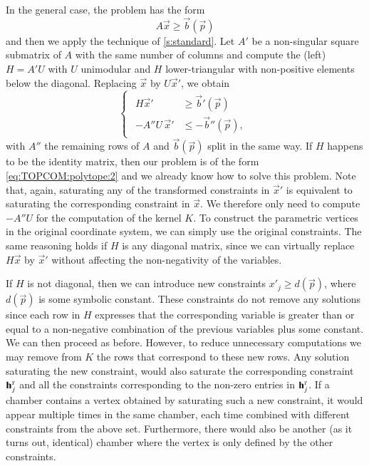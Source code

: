 In the general case, the problem has the form
$$
A \vec x \ge \vec b(\vec p)
$$
and then we apply the technique of \autoref{s:standard}.
Let $A'$ be a non-singular square submatrix of $A$ with the same number
of columns and compute the (left)  $H = A' U$ with $U$ unimodular
and $H$ lower-triangular with non-positive elements below the diagonal.
Replacing $\vec x$ by $U \vec x'$, we obtain
$$
\begin{cases}
    \begin{aligned}
H \vec x' &\ge \vec b'(\vec p)
\\
-A''U \, \vec x' &\le -\vec b''(\vec p)
,
    \end{aligned}
\end{cases}
$$
with $A''$ the remaining rows of $A$ and $\vec b(\vec p)$ split
in the same way.
If $H$ happens to be the identity matrix, then our problem is
of the form \eqref{eq:TOPCOM:polytope:2} and we already know how
to solve this problem.
Note that, again, saturating any of the transformed constraints
in $\vec x'$ is equivalent to saturating the corresponding constraint
in $\vec x$.  We therefore only need to compute $-A'' U$ for the
computation of the kernel $K$.  To construct the parametric vertices
in the original coordinate system, we can simply use the original
constraints.
The same reasoning holds if $H$ is any diagonal matrix, since
we can virtually replace $H \vec x$ by $\vec x'$ without affecting
the non-negativity of the variables.

If $H$ is not diagonal, then we can introduce new constraints
$x'_j \ge d(\vec p)$, where $d(\vec p)$ is some symbolic constant.
These constraints do not remove any solutions
since each row in $H$ expresses that the corresponding variable is
greater than or equal to a non-negative combination of the
previous variables plus some constant.
We can then proceed as before.  However, to reduce unnecessary computations
we may remove from $K$ the rows that correspond to these new rows.
Any solution saturating the new constraint, would also saturate
the corresponding constraint $\vec h_j^\T$ and all
the constraints corresponding to the non-zero
entries in $\vec h_j^\T$.
If a chamber contains a vertex obtained by saturating such a new
constraint, it would appear multiple times in the same chamber,
each time combined with different constraints from the above set.
Furthermore, there would also be another (as it turns out, identical)
chamber where the vertex is only defined by the other constraints.

